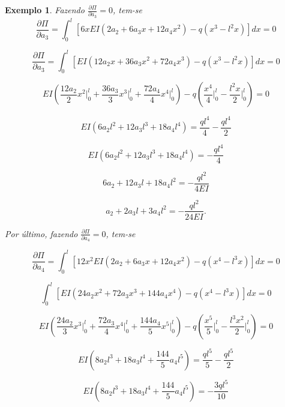 \documentclass[
	12pt,				%
	openright,			%
    twoside,			%
	a4paper,			%
	english,			%
	french,				%
	spanish,			%
	brazil				%
	]{abntex2}
\newtheorem{exemplo}{Exemplo}
\numberwithin{lema}{chapter}
\numberwithin{teorema}{chapter}
\numberwithin{definicao}{chapter}
\numberwithin{exemplo}{chapter}
\numberwithin{figure}{chapter}
\begin{document}
\begin{exemplo}
	Fazendo $\frac{\partial \Pi}{\partial a_3} = 0$, tem-se
	\begin{equation}
		\label{eqn:cap_metodo_ray_ritz:exemp_v3_diff_a3}
		\frac{\partial \Pi}{\partial a_3}
		=
		\int_0^l \left [
			6xEI(2a_2 + 6a_3x + 12a_4x^2)
			-
			q(x^3 - l^2x)
		\right ] dx
		= 0
	\end{equation}
	
	$$
		\frac{\partial \Pi}{\partial a_3}
		=
		\int_0^l \left [
			EI(12 a_2 x + 36 a_3 x^2 + 72 a_4 x^3)
			-
			q(x^3-l^2x)
		\right ] dx
		= 0
	$$
	
	$$
		EI \left (
			\frac{12a_2}{2} x^2 \Big |_0^l
			+
			\frac{36a_3}{3} x^3 \Big |_0^l
			+
			\frac{72a_4}{4} x^4 \Big |_0^l
		\right )
		-
		q \left (
			\frac{x^4}{4} \Big |_0^l
			-
			\frac{l^2 x}{2} \Big |_0^l
		\right )
		= 0
	$$
	
	$$
		EI(6a_2 l^2 + 12a_3 l^3 + 18a_4 l^4)
		=
		\frac{ql^4}{4}
		-
		\frac{ql^4}{2}
	$$
	
	$$
		EI(6a_2 l^2 + 12a_3 l^3 + 18a_4 l^4)
		=
		-\frac{ql^4}{4}
	$$
	
	$$
		6a_2 + 12a_3 l + 18a_4 l^2
		=
		-\frac{ql^2}{4EI}
	$$
	
	\begin{equation}
		\label{eq:exemp_rayritz_approx3_eq2}
		a_2 + 2a_3 l + 3a_4 l^2 = - \frac{ql^2}{24EI}
		\text{.}
	\end{equation}
	
	Por último, fazendo $\frac{\partial \Pi}{\partial a_4}=0$, tem-se
	
	\begin{equation}
		\label{eqn:cap_metodo_ray_ritz:exemp_v3_diff_a4}
		\frac{\partial \Pi}{\partial a_4}
		=
		\int_0^l \left [
			12x^2EI(2a_2 + 6a_3x + 12a_4x^2)
			-
			q(x^4 - l^3x)
		\right ] dx
		= 0
	\end{equation}
	
	$$
		\int_0^l \left [
			EI(24a_2 x^2 + 72 a_3 x^3 + 144 a_4 x^4)
			-
			q(x^4 - l^3 x)
		\right ] dx
		= 0
	$$
	
	$$
		EI \left ( 
			\frac{24a_2}{3}x^3 \Big |_0^l
			+
			\frac{72a_3}{4}x^4 \Big |_0^l
			+
			\frac{144a_4}{5}x^5 \Big |_0^l
		\right )
		-
		q \left (
			\frac{x^5}{5} \Big |_0^l
			-
			\frac{l^3x^2}{2} \Big |_0^l
		\right )
		= 0
	$$
	
	$$
		EI \left (
			8a_2 l^3 + 18 a_3 l^4 + \frac{144}{5} a_4 l^5
		\right )
		=
		\frac{ql^5}{5}
		-
		\frac{ql^5}{2}
	$$
	
	$$
		EI \left (
			8a_2 l^3 + 18 a_3 l^4 + \frac{144}{5} a_4 l^5
		\right )
		=
		-\frac{3ql^5}{10}
	$$
	

\end{exemplo}
\end{document}
